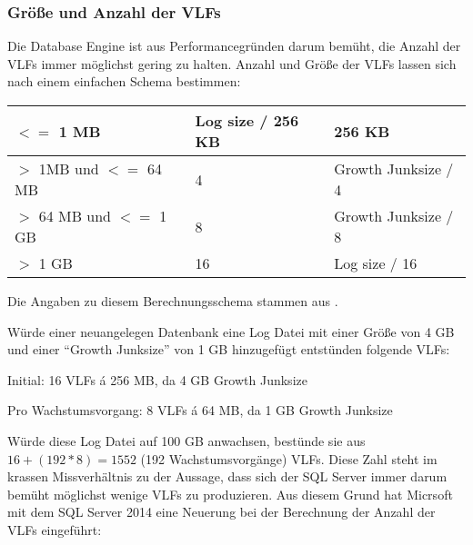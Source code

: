         \subsubsection{Größe und Anzahl der VLFs}
        \label{sizeandnumberofvlfs}
          Die Database Engine ist aus Performancegründen darum bemüht, die Anzahl
          der VLFs immer möglichst gering zu halten. Anzahl und Größe der VLFs
          lassen sich nach einem einfachen Schema bestimmen:
          \begin{center}
            \tabletail{
              \hline
            }
            \tablelasttail{
              \hline
            }
            \begin{supertabular}{|l|l|l|}
              $<=$ 1 MB & Log size / 256 KB & 256 KB \\
              \hline
              $>$ 1MB  und $<=$ 64 MB & 4 & Growth Junksize / 4 \\
              \hline
              $>$ 64 MB und $<=$ 1 GB & 8 & Growth Junksize / 8 \\
              \hline
              $>$ 1 GB & 16 & Log size / 16 \\
            \end{supertabular}
          \end{center}
          Die Angaben zu diesem Berechnungsschema stammen aus
          \parencite{isbn9780735658561}. 
          
          Würde einer neuangelegen Datenbank eine Log Datei mit einer Größe von
          4 GB und einer \enquote{Growth Junksize} von 1 GB hinzugefügt
          entstünden folgende VLFs:
          
          Initial: 16 VLFs \'a 256 MB, da 4 GB Growth Junksize
          
          Pro Wachstumsvorgang: 8 VLFs \'a 64 MB, da 1 GB Growth Junksize
          
          Würde diese Log Datei auf 100 GB anwachsen, bestünde sie aus $16 +
          (192 * 8) = 1552$ (192 Wachstumsvorgänge) VLFs. Diese
          Zahl steht im krassen Missverhältnis zu der Aussage, dass sich der SQL
          Server immer darum bemüht möglichst wenige VLFs zu produzieren. Aus
          diesem Grund hat Micrsoft mit dem SQL Server 2014 eine Neuerung bei
          der Berechnung der Anzahl der VLFs eingeführt:
          
